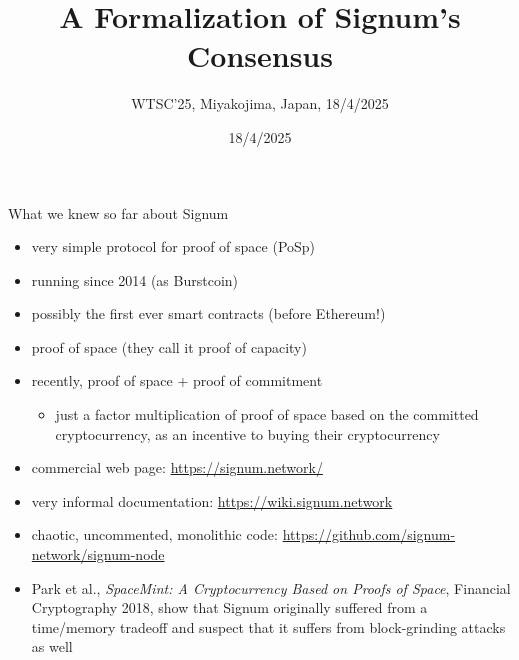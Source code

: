 \documentclass[11pt]{beamer}  %
\subtitle{WTSC'25, Miyakojima, Japan, 18/4/2025}
\title{A Formalization of Signum's Consensus}
\institute{Universit\`a di Verona, Italy}
\date{18/4/2025}
\begin{document}
\begin{frame}
  \titlepage
\end{frame}

\begin{frame}{What we knew so far about Signum}

  \begin{itemize}
  \item very simple protocol for proof of space (PoSp)
  \item running since 2014 (as Burstcoin)
  \item possibly the first ever smart contracts (before Ethereum!)
  \item proof of space (they call it proof of capacity)
  \item recently, proof of space + proof of commitment
    \begin{itemize}
    \item[] just a factor multiplication of proof of space
      based on the committed cryptocurrency, as an incentive
      to buying their cryptocurrency
    \end{itemize}
  \item commercial web page: \url{https://signum.network/}
  \item very informal documentation:
    \url{https://wiki.signum.network}
  \item chaotic, uncommented, monolithic code:
    \url{https://github.com/signum-network/signum-node}
  \item Park et al., \emph{SpaceMint: A Cryptocurrency Based on Proofs of Space},
    Financial Cryptography 2018,
    show that Signum originally suffered from a time/memory tradeoff
    and suspect that it suffers from block-grinding attacks as well
  \end{itemize}

\end{frame}
\end{document}
